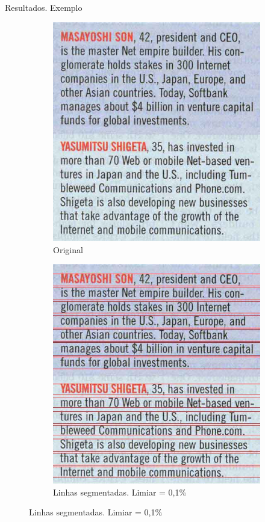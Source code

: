 \documentclass{beamer}
\begin{document}
\begin{frame}[allowframebreaks]{Resultados. Exemplo}
\begin{figure}
    \centering
    \begin{subfigure}[]{0.49\textwidth}
        \centering
        \includegraphics[width=\textwidth]{images/2.jpg}
        \caption{Original}
    \end{subfigure}
    \begin{subfigure}[]{0.49\textwidth}
        \centering
        \includegraphics[width=\textwidth]{images/2_lines_001.jpg}
        \caption{Linhas segmentadas. Limiar = 0,1\%}
    \end{subfigure}
\end{figure}


\end{frame}
\end{document}
